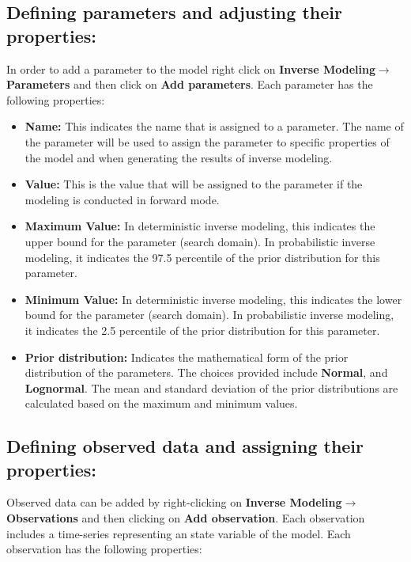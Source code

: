 \subsection{Defining parameters and adjusting their properties: }
In order to add a parameter to the model right click on \textbf{Inverse Modeling}$\rightarrow$\textbf{Parameters} and then click on \textbf{Add parameters}. Each parameter has the following properties: 

\begin{itemize}
    \item \textbf{Name: } This indicates the name that is assigned to a parameter. The name of the parameter will be used to assign the parameter to specific properties of the model and when generating the results of inverse modeling.
    \item \textbf{Value: } This is the value that will be assigned to the parameter if the modeling is conducted in forward mode. 
    \item \textbf{Maximum Value: } In deterministic inverse modeling, this indicates the upper bound for the parameter (search domain). In probabilistic inverse modeling, it indicates the 97.5 percentile of the prior distribution for this parameter. 
    \item \textbf{Minimum Value: } In deterministic inverse modeling, this indicates the lower bound for the parameter (search domain). In probabilistic inverse modeling, it indicates the 2.5 percentile of the prior distribution for this parameter.
    \item \textbf{Prior distribution: } Indicates the mathematical form of the prior distribution of the parameters. The choices provided include \textbf{Normal}, and \textbf{Lognormal}. The mean and standard deviation of the prior distributions are calculated based on the maximum and minimum values. 
\end{itemize}

\subsection{Defining observed data and assigning their properties: }
Observed data can be added by right-clicking on \textbf{Inverse Modeling}$\rightarrow$\textbf{Observations} and then clicking on \textbf{Add observation}. Each observation includes a time-series representing an state variable of the model. Each observation has the following properties: 

